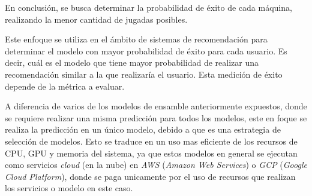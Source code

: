 \documentclass[11pt,a4paper,twoside]{thesis}
\begin{document}
En conclusión, se busca determinar la probabilidad de éxito de cada máquina,
realizando la menor cantidad de jugadas posibles.

Este enfoque se utiliza en el ámbito de sistemas de recomendación para
determinar el modelo con mayor probabilidad de éxito para cada usuario. Es
decir, cuál es el modelo que tiene mayor probabilidad de realizar una
recomendación similar a la que realizaría el usuario. Esta medición de éxito
depende de la métrica a evaluar.

A diferencia de varios de los modelos de ensamble anteriormente expuestos,
donde se requiere realizar una misma predicción para todos los modelos, este en
foque se realiza la predicción en un único modelo, debido a que es una
estrategia de selección de modelos. Esto se traduce en un uso mas eficiente de
los recursos de CPU, GPU y memoria del sistema, ya que estos modelos en general
se ejecutan como servicios \textit{cloud} (en la nube) en \textit{AWS}
(\textit{Amazon Web Services}) o \textit{GCP} (\textit{Google Cloud Platform}),
donde se paga unicamente por el uso de recursos que realizan los servicios o
modelo en este caso.



\renewcommand{\bibname}{Referencias}
\end{document}
